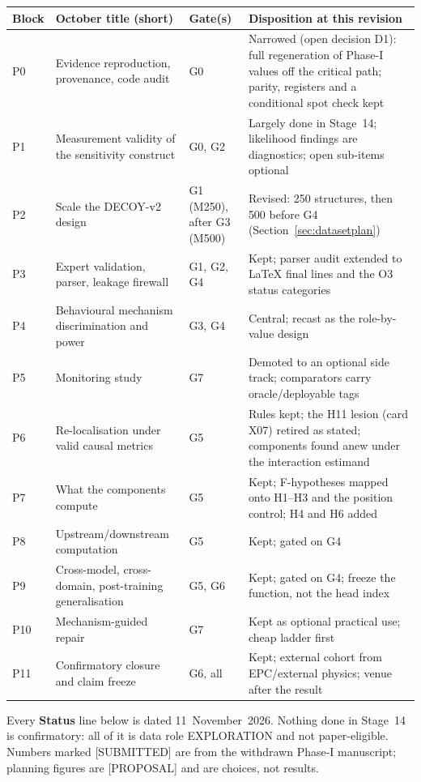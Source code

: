 \documentclass[10pt,a4paper]{article}
\newcommand{\tg}[1]{\textsc{[#1]}}
\begin{document}
\begin{center}\small
\begin{tabularx}{\linewidth}{@{}P{0.9cm}P{4.1cm}P{1.7cm}L@{}}
\toprule
Block & October title (short) & Gate(s) & Disposition at this revision \\
\midrule
P0 & Evidence reproduction, provenance, code audit & G0 & Narrowed (open decision D1): full regeneration of Phase-I values off the critical path; parity, registers and a conditional spot check kept \\
P1 & Measurement validity of the sensitivity construct & G0, G2 & Largely done in Stage~14; likelihood findings are diagnostics; open sub-items optional \\
P2 & Scale the DECOY-v2 design & G1 (M250), after G3 (M500) & Revised: 250 structures, then 500 before G4 (Section~\ref{sec:datasetplan}) \\
P3 & Expert validation, parser, leakage firewall & G1, G2, G4 & Kept; parser audit extended to LaTeX final lines and the O3 status categories \\
P4 & Behavioural mechanism discrimination and power & G3, G4 & Central; recast as the role-by-value design \\
P5 & Monitoring study & G7 & Demoted to an optional side track; comparators carry oracle/deployable tags \\
P6 & Re-localisation under valid causal metrics & G5 & Rules kept; the H11 lesion (card X07) retired as stated; components found anew under the interaction estimand \\
P7 & What the components compute & G5 & Kept; F-hypotheses mapped onto H1--H3 and the position control; H4 and H6 added \\
P8 & Upstream/downstream computation & G5 & Kept; gated on G4 \\
P9 & Cross-model, cross-domain, post-training generalisation & G5, G6 & Kept; gated on G4; freeze the function, not the head index \\
P10 & Mechanism-guided repair & G7 & Kept as optional practical use; cheap ladder first \\
P11 & Confirmatory closure and claim freeze & G6, all & Kept; external cohort from EPC/external physics; venue after the result \\
\bottomrule
\end{tabularx}
\end{center}

Every \textbf{Status} line below is dated 11~November~2026. Nothing done in Stage~14 is confirmatory: all of it is
data role EXPLORATION and not paper-eligible. Numbers marked \tg{SUBMITTED} are from the withdrawn Phase-I
manuscript; planning figures are \tg{PROPOSAL} and are choices, not results.
\end{document}
